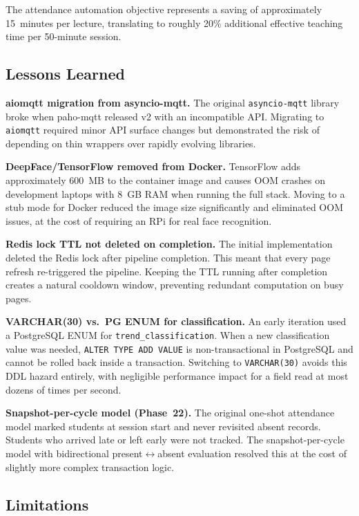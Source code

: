 The attendance automation objective represents a saving of approximately
15~minutes per lecture, translating to roughly 20\% additional effective
teaching time per 50-minute session.

\subsection{Lessons Learned}
\label{subsec:lessons}

\textbf{aiomqtt migration from asyncio-mqtt.}  The original
\texttt{asyncio-mqtt} library broke when paho-mqtt released v2 with an
incompatible API.  Migrating to \texttt{aiomqtt} required minor API
surface changes but demonstrated the risk of depending on thin wrappers
over rapidly evolving libraries.

\textbf{DeepFace/TensorFlow removed from Docker.}  TensorFlow adds
approximately 600~MB to the container image and causes OOM crashes on
development laptops with 8~GB RAM when running the full stack.  Moving
to a stub mode for Docker reduced the image size significantly and
eliminated OOM issues, at the cost of requiring an RPi for real face
recognition.

\textbf{Redis lock TTL not deleted on completion.}  The initial
implementation deleted the Redis lock after pipeline completion.  This
meant that every page refresh re-triggered the pipeline.  Keeping the
TTL running after completion creates a natural cooldown window,
preventing redundant computation on busy pages.

\textbf{VARCHAR(30) vs.\ PG ENUM for classification.}  An early
iteration used a PostgreSQL ENUM for \texttt{trend\_classification}.
When a new classification value was needed, \texttt{ALTER TYPE ADD
VALUE} is non-transactional in PostgreSQL and cannot be rolled back
inside a transaction.  Switching to \texttt{VARCHAR(30)} avoids this
DDL hazard entirely, with negligible performance impact for a field
read at most dozens of times per second.

\textbf{Snapshot-per-cycle model (Phase~22).}  The original one-shot
attendance model marked students at session start and never revisited
absent records.  Students who arrived late or left early were not
tracked.  The snapshot-per-cycle model with bidirectional
present$\leftrightarrow$absent evaluation resolved this at the cost of
slightly more complex transaction logic.

\subsection{Limitations}
\label{subsec:limitations}

